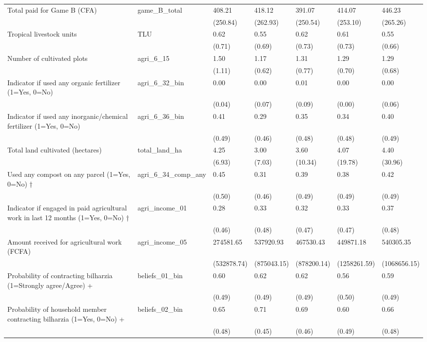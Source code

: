 \begin{table}
\begin{tabular}[t]{lllllll}
Total paid for Game B (CFA) & game_B_total & 408.21 & 418.12 & 391.07 & 414.07 & 446.23\\
 &  & (250.84) & (262.93) & (250.54) & (253.10) & (265.26)\\
\addlinespace
Tropical livestock units & TLU & 0.62 & 0.55 & 0.62 & 0.61 & 0.55\\
 &  & (0.71) & (0.69) & (0.73) & (0.73) & (0.66)\\
Number of cultivated plots & agri_6_15 & 1.50 & 1.17 & 1.31 & 1.29 & 1.29\\
 &  & (1.11) & (0.62) & (0.77) & (0.70) & (0.68)\\
Indicator if used any organic fertilizer (1=Yes, 0=No) & agri_6_32_bin & 0.00 & 0.00 & 0.01 & 0.00 & 0.00\\
\addlinespace
 &  & (0.04) & (0.07) & (0.09) & (0.00) & (0.06)\\
Indicator if used any inorganic/chemical fertilizer (1=Yes, 0=No) & agri_6_36_bin & 0.41 & 0.29 & 0.35 & 0.34 & 0.40\\
 &  & (0.49) & (0.46) & (0.48) & (0.48) & (0.49)\\
Total land cultivated (hectares) & total_land_ha & 4.25 & 3.00 & 3.60 & 4.07 & 4.40\\
 &  & (6.93) & (7.03) & (10.34) & (19.78) & (30.96)\\
\addlinespace
Used any compost on any parcel (1=Yes, 0=No) † & agri_6_34_comp_any & 0.45 & 0.31 & 0.39 & 0.38 & 0.42\\
 &  & (0.50) & (0.46) & (0.49) & (0.49) & (0.49)\\
Indicator if engaged in paid agricultural work in last 12 months (1=Yes, 0=No) † & agri_income_01 & 0.28 & 0.33 & 0.32 & 0.33 & 0.37\\
 &  & (0.46) & (0.48) & (0.47) & (0.47) & (0.48)\\
Amount received for agricultural work (FCFA) & agri_income_05 & 274581.65 & 537920.93 & 467530.43 & 449871.18 & 540305.35\\
\addlinespace
 &  & (532878.74) & (875043.15) & (878200.14) & (1258261.59) & (1068656.15)\\
Probability of contracting bilharzia (1=Strongly agree/Agree) + & beliefs_01_bin & 0.60 & 0.62 & 0.62 & 0.56 & 0.59\\
 &  & (0.49) & (0.49) & (0.49) & (0.50) & (0.49)\\
Probability of household member contracting bilharzia (1=Yes, 0=No) + & beliefs_02_bin & 0.65 & 0.71 & 0.69 & 0.60 & 0.66\\
 &  & (0.48) & (0.45) & (0.46) & (0.49) & (0.48)\\

\end{tabular}
\end{table}
